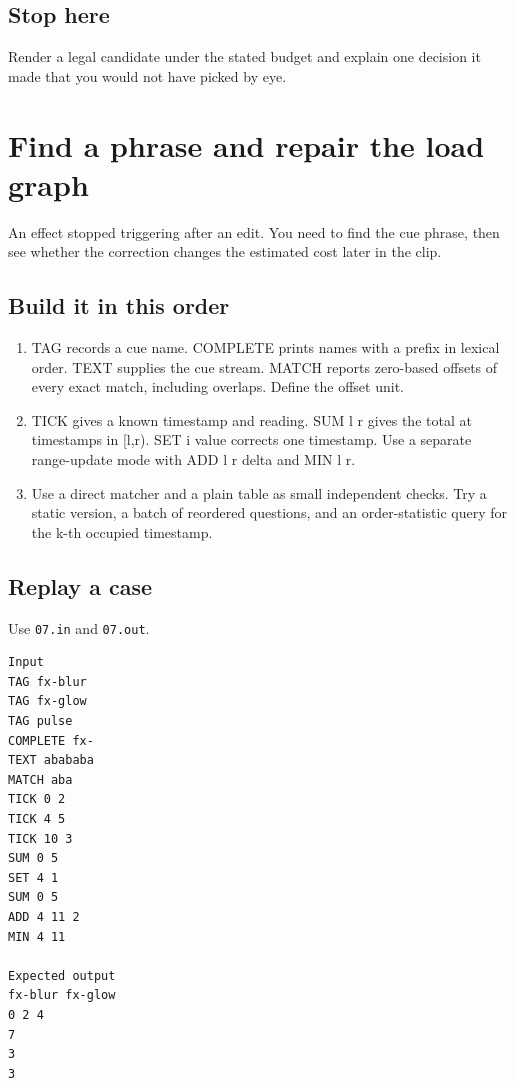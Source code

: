 \documentclass[11pt,letterpaper]{article}
\begin{document}
\subsection*{Stop here}

Render a legal candidate under the stated budget and explain one decision it made that you would not have picked by eye.

\clearpage

\section{Find a phrase and repair the load graph}\label{visuals:07}

An effect stopped triggering after an edit. You need to find the cue phrase, then see whether the correction changes the estimated cost later in the clip.

\subsection*{Build it in this order}

\begin{enumerate}
\item TAG records a cue name. COMPLETE prints names with a prefix in lexical order. TEXT supplies the cue stream. MATCH reports zero-based offsets of every exact match, including overlaps. Define the offset unit.
\item TICK gives a known timestamp and reading. SUM l r gives the total at timestamps in [l,r). SET i value corrects one timestamp. Use a separate range-update mode with ADD l r delta and MIN l r.
\item Use a direct matcher and a plain table as small independent checks. Try a static version, a batch of reordered questions, and an order-statistic query for the k-th occupied timestamp.
\end{enumerate}

\subsection*{Replay a case}

Use \texttt{07.in} and \texttt{07.out}.

\begin{samepage}
\small
\begin{verbatim}
Input
TAG fx-blur
TAG fx-glow
TAG pulse
COMPLETE fx-
TEXT abababa
MATCH aba
TICK 0 2
TICK 4 5
TICK 10 3
SUM 0 5
SET 4 1
SUM 0 5
ADD 4 11 2
MIN 4 11

Expected output
fx-blur fx-glow
0 2 4
7
3
3
\end{verbatim}
\end{samepage}
\end{document}
